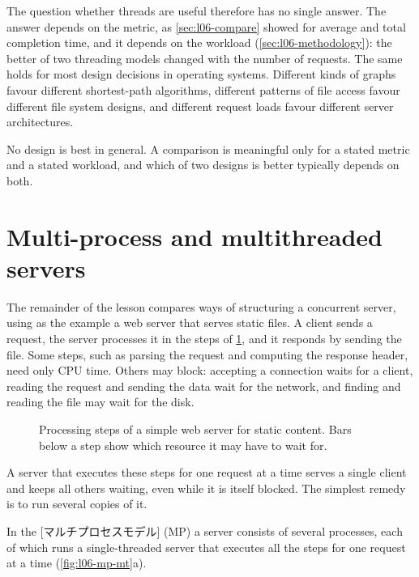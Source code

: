 \documentclass[../main.tex]{subfiles}
\begin{document}
The question whether threads are useful therefore has no single answer.
The answer depends on the metric, as \cref{sec:l06-compare} showed for
average and total completion time, and it depends on the workload
(\cref{sec:l06-methodology}): the
better of two threading models changed with the number of requests.  The
same holds for most design decisions in operating systems.  Different kinds
of graphs favour different shortest-path algorithms, different patterns of
file access favour different file system designs, and different request
loads favour different server architectures.

\begin{keypoint}
  No design is best in general.  A comparison is meaningful only for a
  stated metric and a stated workload, and which of two designs is better
  typically depends on both.
\end{keypoint}

\section{Multi-process and multithreaded servers}
\label{sec:l06-mp-mt}

The remainder of the lesson compares ways of structuring a concurrent
server, using as the example a web server that serves static
files.  A client sends a request,
the server processes it in the steps of \cref{fig:l06-web-steps}, and it
responds by sending the file.  Some steps, such as parsing the request and
computing the response header, need only CPU time.  Others may block:
accepting a connection waits for a client, reading the request and sending
the data wait for the network, and finding and reading the file may wait
for the disk.

\begin{figure}[htbp]
  \centering
  
  \caption{Processing steps of a simple web server for static content.
    Bars below a step show which resource it may have to wait for.}
  \label{fig:l06-web-steps}
\end{figure}

A server that executes these steps for one request at a time serves a
single client and keeps all others waiting, even while it is itself
blocked.  The simplest remedy is to run several copies of it.

\begin{definition}
  In the [マルチプロセスモデル] (MP) a server
  consists of several processes, each of which runs a single-threaded
  server that executes all the steps for one request at a time
  (\cref{fig:l06-mp-mt}a).
\end{definition}
\end{document}
